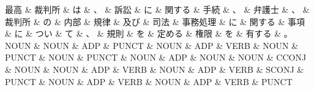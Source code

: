 \documentclass[tikz,border=5pt]{standalone}
\begin{document}
\small
\begin{dependency}[edge unit distance=8.6pt]
    \begin{deptext}[column sep=0.5em]
        最高 \& 裁判所 \& は \& 、 \& 訴訟 \& に \& 関する \& 手続 \& 、 \& 弁護士 \& 、 \& 裁判所 \& の \& 内部 \& 規律 \& 及び \& 司法 \& 事務処理 \& に \& 関する \& 事項 \& に \& つい \& て \& 、 \& 規則 \& を \& 定める \& 権限 \& を \& 有する \& 。\\
        NOUN \& NOUN \& ADP \& PUNCT \& NOUN \& ADP \& VERB \& NOUN \& PUNCT \& NOUN \& PUNCT \& NOUN \& ADP \& NOUN \& NOUN \& CCONJ \& NOUN \& NOUN \& ADP \& VERB \& NOUN \& ADP \& VERB \& SCONJ \& PUNCT \& NOUN \& ADP \& VERB \& NOUN \& ADP \& VERB \& PUNCT\\
    \end{deptext}
\end{dependency}
\end{document}
